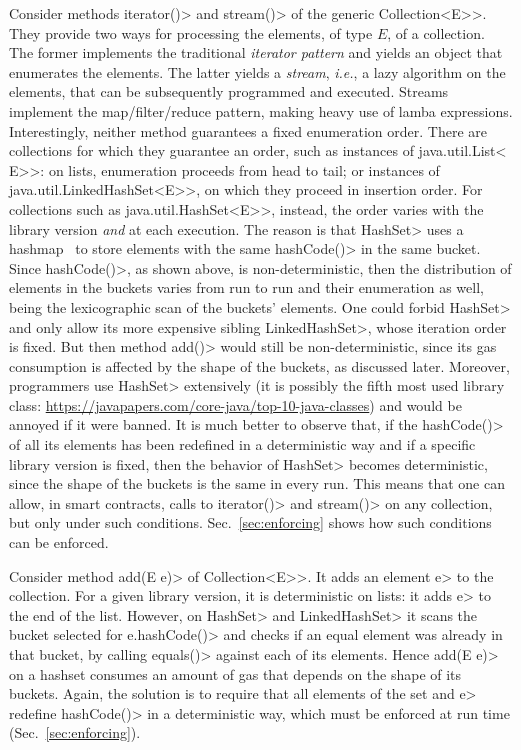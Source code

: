 Consider methods \<iterator()> and \<stream()> of the generic
\<Collection$\text{<}$E$\text{>}$>. They provide two ways for
processing the elements, of type $E$, of a collection. The former implements
the traditional \emph{iterator pattern} and yields an object that enumerates
the elements. The latter yields a \emph{stream}, \emph{i.e.},
a lazy algorithm on the
elements, that can be subsequently programmed and executed.
Streams implement the map/filter/reduce pattern, making
heavy use of lamba expressions.
Interestingly, neither method
guarantees a fixed enumeration order.
There are collections for which they
guarantee an order, such as instances of \<java.util.List$\text{<}$E$\text{>}$>:
on lists, enumeration proceeds from head to tail;
or instances of \<java.util.LinkedHashSet$\text{<}$E$\text{>}$>, on which they proceed in
insertion order.
For collections such as \<java.util.HashSet$\text{<}$E$\text{>}$>, instead, the order
varies with the library version \emph{and} at each execution. The reason is that
\<HashSet> uses a hashmap~\cite{CormenLRS09}
to store elements with the same \<hashCode()> in the same bucket.
Since \<hashCode()>, as shown above, is non-deterministic, then
the distribution of elements in the buckets varies from run to run and their enumeration
as well, being the lexicographic scan of the buckets' elements.
One could forbid \<HashSet> and only allow its
more expensive sibling \<LinkedHashSet>, whose iteration order is fixed.
But then method \<add()> would still be non-deterministic, since its gas consumption
is affected by the shape of the buckets, as discussed later.
Moreover, programmers use \<HashSet> extensively
(it is possibly the fifth most used library class:
\url{https://javapapers.com/core-java/top-10-java-classes})
and would be annoyed if it were
banned. It is much better to observe that,
if the \<hashCode()> of all its elements has been redefined in a deterministic way
and if a specific library version is fixed, then the behavior of \<HashSet> becomes
deterministic, since the shape of the buckets is the same in every run. This means that one
can allow, in smart contracts, calls to \<iterator()> and \<stream()> on any collection,
but only under such conditions. Sec.~\ref{sec:enforcing} shows how such conditions can be enforced.

Consider method \<add(E e)> of \<Collection$\text{<}$E$\text{>}$>.
It adds an element \<e> to the collection. For a given library version,
it is deterministic on lists: it adds \<e> to the end of the list.
However, on \<HashSet> and \<LinkedHashSet> it scans the bucket selected
for \<e.hashCode()> and checks if an equal element was already in that
bucket, by calling \<equals()> against each of its elements. Hence \<add(E e)>
on a hashset consumes an amount of gas that depends on the shape of its buckets.
Again, the solution is to require that all elements of the set and \<e> redefine
\<hashCode()> in a deterministic way, which must be enforced at run time
(Sec.~\ref{sec:enforcing}).

